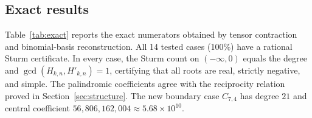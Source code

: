 \documentclass[11pt,a4paper]{article}
\theoremstyle{definition}
\begin{document}
\subsection{Exact results}

Table~\ref{tab:exact} reports the exact numerators obtained by tensor
contraction and binomial-basis reconstruction. All 14 tested cases
(100\%) have a rational Sturm certificate. In every case, the
Sturm count on $(-\infty,0)$ equals the degree and
$\gcd(H_{k,n},H'_{k,n})=1$, certifying that all roots are real, strictly
negative, and simple. The palindromic coefficients agree with the
reciprocity relation proved in Section~\ref{sec:structure}. The new boundary
case $C_{7,4}$ has degree $21$ and central coefficient
$56{,}806{,}162{,}004\approx5.68\times10^{10}$.

\small
\setlength{\tabcolsep}{3pt}
\end{document}
